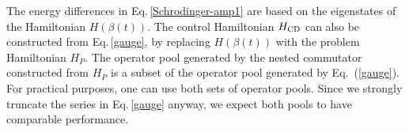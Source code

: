 \documentclass[twocolumn,aps,superscriptaddress,floatfix,longbibliography]{revtex4-2}
\newcommand{\Eq}[1]{Eq.\,\eqref{#1}}
\begin{document}


The energy differences in \Eq{Schrodinger-amp1} are based on the
eigenstates of the Hamiltonian $H(\beta(t))$.  The control
Hamiltonian $H_{\rm CD}$ can also be constructed from
\Eq{gauge}, by replacing $H(\beta(t))$ with the problem
Hamiltonian $H_P$.  The operator pool generated by the nested
commutator constructed from $H_P$ is a subset of the operator
pool generated by Eq.~(\ref{gauge}). For practical purposes, one
can use both sets of operator pools. Since we strongly truncate
the series in \Eq{gauge} anyway, we expect both pools to have
comparable performance. 


\end{document}
